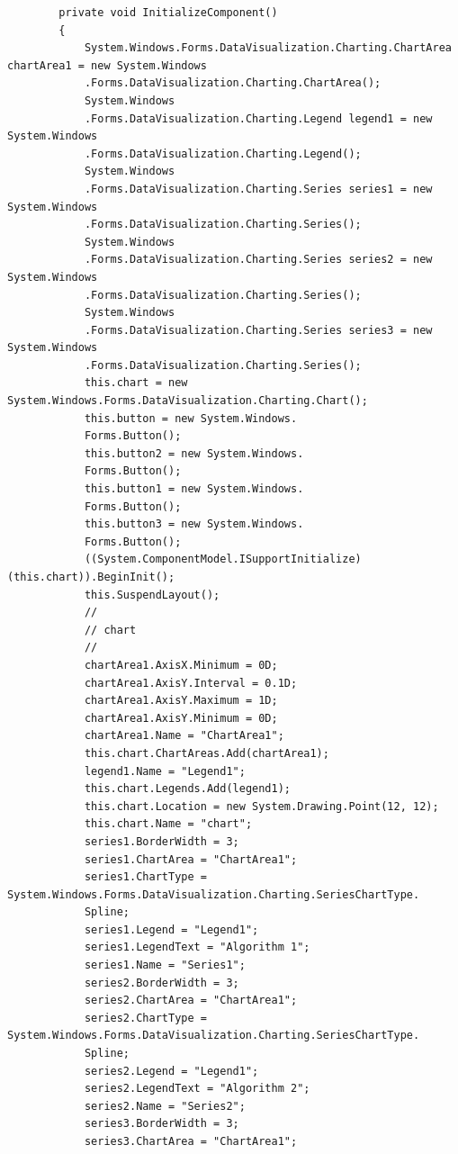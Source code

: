 \documentclass[a4paper]{article}
\begin{document}
\begin{verbatim}
        private void InitializeComponent()
        {
            System.Windows.Forms.DataVisualization.Charting.ChartArea chartArea1 = new System.Windows
            .Forms.DataVisualization.Charting.ChartArea();
            System.Windows
            .Forms.DataVisualization.Charting.Legend legend1 = new System.Windows
            .Forms.DataVisualization.Charting.Legend();
            System.Windows
            .Forms.DataVisualization.Charting.Series series1 = new System.Windows
            .Forms.DataVisualization.Charting.Series();
            System.Windows
            .Forms.DataVisualization.Charting.Series series2 = new System.Windows
            .Forms.DataVisualization.Charting.Series();
            System.Windows
            .Forms.DataVisualization.Charting.Series series3 = new System.Windows
            .Forms.DataVisualization.Charting.Series();
            this.chart = new System.Windows.Forms.DataVisualization.Charting.Chart();
            this.button = new System.Windows.
            Forms.Button();
            this.button2 = new System.Windows.
            Forms.Button();
            this.button1 = new System.Windows.
            Forms.Button();
            this.button3 = new System.Windows.
            Forms.Button();
            ((System.ComponentModel.ISupportInitialize)(this.chart)).BeginInit();
            this.SuspendLayout();
            // 
            // chart
            // 
            chartArea1.AxisX.Minimum = 0D;
            chartArea1.AxisY.Interval = 0.1D;
            chartArea1.AxisY.Maximum = 1D;
            chartArea1.AxisY.Minimum = 0D;
            chartArea1.Name = "ChartArea1";
            this.chart.ChartAreas.Add(chartArea1);
            legend1.Name = "Legend1";
            this.chart.Legends.Add(legend1);
            this.chart.Location = new System.Drawing.Point(12, 12);
            this.chart.Name = "chart";
            series1.BorderWidth = 3;
            series1.ChartArea = "ChartArea1";
            series1.ChartType = System.Windows.Forms.DataVisualization.Charting.SeriesChartType.
            Spline;
            series1.Legend = "Legend1";
            series1.LegendText = "Algorithm 1";
            series1.Name = "Series1";
            series2.BorderWidth = 3;
            series2.ChartArea = "ChartArea1";
            series2.ChartType = System.Windows.Forms.DataVisualization.Charting.SeriesChartType.
            Spline;
            series2.Legend = "Legend1";
            series2.LegendText = "Algorithm 2";
            series2.Name = "Series2";
            series3.BorderWidth = 3;
            series3.ChartArea = "ChartArea1";

\end{verbatim}
\end{document}

